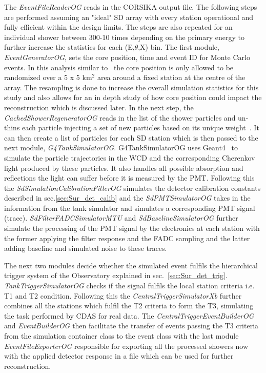 The \textit{EventFileReaderOG} reads in the CORSIKA output file. The following steps are performed assuming an "ideal" SD array with every station operational and fully efficient within the design limits. The steps are also repeated for an individual shower between 300-10 times depending on the primary energy to further increase the statistics for each (E,$\theta$,X) bin. The first module, \textit{EventGeneratorOG}, sets the core position, time and event ID for Monte Carlo events. In this analysis similar to~\cite{gap_note_2013} the core position is only allowed to be randomized over a 5 x 5 km$^2$ area around a fixed station at the centre of the array. The resampling is done to increase the overall simulation statistics for this study and also allows for an in depth study of how core position could impact the reconstruction which is discussed later. In the next step, the \textit{CachedShowerRegeneratorOG} reads in the list of the shower particles and un-thins each particle injecting a set of new particles based on its unique weight~\cite{Stokes:2011wf}. It can then create a list of particles for each SD station which is then passed to the next module, \textit{G4TankSimulatorOG}. G4TankSimulatorOG uses Geant4~\cite{GEANT4:2002zbu,Allison:2006ve,Allison:2016lfl} to simulate the particle trajectories in the WCD and the corresponding Cherenkov light produced by these particles. It also handles all possible absorption and reflections the light can suffer before it is measured by the PMT. Following this the \textit{SdSimulationCalibrationFillerOG} simulates the detector calibration constants described in sec.\ref{sec:Sur_det_calib} and the \textit{SdPMTSimulatorOG} takes in the information from the tank simulator and simulates a corresponding PMT signal (trace). \textit{SdFilterFADCSimulatorMTU} and \textit{SdBaselineSimulatorOG} further simulate the processing of the PMT signal by the electronics at each station with the former applying the filter response and the FADC sampling and the latter adding baseline and simulated noise to these traces. 

The next two modules decide whether the simulated event fulfils the hierarchical trigger system of the Observatory explained in sec.~\ref{sec:Sur_det_trig}. \textit{TankTriggerSimulatorOG} checks if the signal fulfils the local station criteria i.e. T1 and T2 condition. Following this the \textit{CentralTriggerSimulatorXb} further combines all the stations which fulfil the T2 criteria to form the T3, simulating the task performed by CDAS for real data. The \textit{CentralTriggerEventBuilderOG} and \textit{EventBuilderOG} then facilitate the transfer of events passing the T3 criteria from the simulation container class to the event class with the last module \textit{EventFileExporterOG} responsible for exporting all the processed showers now with the applied detector response in a file which can be used for further reconstruction.  


